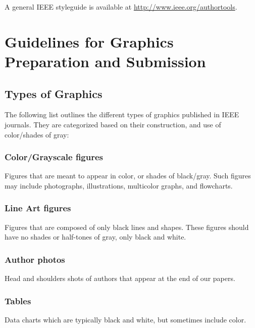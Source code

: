 \documentclass{ieeeaccess}
\begin{document}
A general IEEE styleguide is available at \underline{http://www.ieee.org/}\break\underline{authortools}.

\section{Guidelines for Graphics Preparation and Submission}
\label{sec:guidelines}

\subsection{Types of Graphics}
The following list outlines the different types of graphics published in 
IEEE journals. They are categorized based on their construction, and use of 
color/shades of gray:

\subsubsection{Color/Grayscale figures}
{Figures that are meant to appear in color, or shades of black/gray. Such 
figures may include photographs, illustrations, multicolor graphs, and 
flowcharts.}

\subsubsection{Line Art figures}
{Figures that are composed of only black lines and shapes. These figures 
should have no shades or half-tones of gray, only black and white.}

\subsubsection{Author photos}
{Head and shoulders shots of authors that appear at the end of our papers. }

\subsubsection{Tables}
{Data charts which are typically black and white, but sometimes include 
color.}
\end{document}
